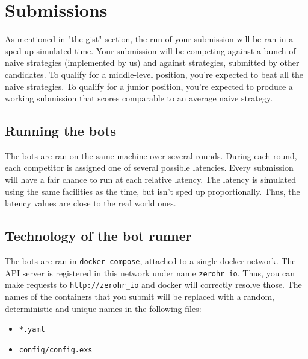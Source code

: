 \documentclass{article}
\begin{document}
\pagebreak

\section{Submissions}

As mentioned in "the gist" section, the run of your submission will be ran in a sped-up simulated time. Your submission will be competing against a bunch of naive strategies (implemented by us) and against strategies, submitted by other candidates. To qualify for a middle-level position, you're expected to beat all the naive strategies. To qualify for a junior position, you're expected to produce a working submission that scores comparable to an average naive strategy.

\subsection{Running the bots}

The bots are ran on the same machine over several rounds. During each round, each competitor is assigned one of several possible latencies. Every submission will have a fair chance to run at each relative latency. The latency is simulated using the same facilities as the time, but isn't sped up proportionally. Thus, the latency values are close to the real world ones.

\subsection{Technology of the bot runner}

The bots are ran in \texttt{docker compose}, attached to a single docker network. The API server is registered in this network under name \texttt{zerohr\_io}. Thus, you can make requests to \texttt{http://zerohr\_io} and docker will correctly resolve those. The names of the containers that you submit will be replaced with a random, deterministic and unique names in the following files:
\begin{itemize}
    \item \texttt{*.yaml}
    \item \texttt{config/config.exs}
\end{itemize}
\end{document}
